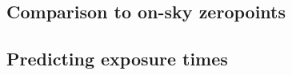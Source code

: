 \begin{colsection}
\begin{colsection}

\end{colsection}

\newpage
\subsection{Comparison to on-sky zeropoints}
\label{sec:onsky_throughput}
\begin{colsection}


\end{colsection}


\newpage
\subsection{Predicting exposure times}
\label{sec:etc}
\begin{colsection}


\end{colsection}


\end{colsection}

